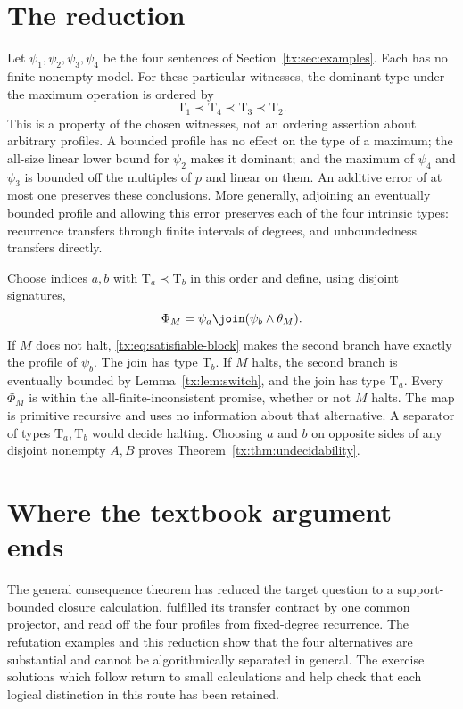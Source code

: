\section{The reduction}
Let $\psi_1,\psi_2,\psi_3,\psi_4$ be the four sentences of
Section~\ref{tx:sec:examples}. Each has no finite nonempty model. For these particular
witnesses, the dominant type under the maximum operation is ordered by
\[
                 \mathrm T_1\prec\mathrm T_4\prec\mathrm T_3\prec\mathrm T_2.
\]
This is a property of the chosen witnesses, not an ordering assertion about
arbitrary profiles. A bounded profile has no effect on the type of a maximum;
the all-size linear lower bound for $\psi_2$ makes it dominant; and the
maximum of $\psi_4$ and $\psi_3$ is bounded off the multiples of $p$ and
linear on them. An additive error of at most one preserves these conclusions.
More generally, adjoining an eventually bounded profile and allowing this
error preserves each of the four intrinsic types: recurrence transfers
through finite intervals of degrees, and unboundedness transfers directly.

Choose indices $a,b$ with $\mathrm T_a\prec\mathrm T_b$ in this order
and define, using disjoint signatures,
\[
             \Phi_M=\psi_a\join(\psi_b\wedge\theta_M).
\]
If $M$ does not halt, \eqref{tx:eq:satisfiable-block} makes the second branch
have exactly the profile of $\psi_b$. The join has type $\mathrm T_b$. If $M$ halts,
the second branch is eventually bounded by Lemma~\ref{tx:lem:switch}, and the
join has type $\mathrm T_a$. Every $\Phi_M$ is within the all-finite-inconsistent
promise, whether or not $M$ halts. The map is primitive recursive and
uses no information about that alternative. A separator of types $\mathrm T_a,\mathrm T_b$
would decide halting. Choosing $a$ and $b$ on opposite sides of any
disjoint nonempty $A,B$ proves Theorem~\ref{tx:thm:undecidability}.

\section{Where the textbook argument ends}
The general consequence theorem has reduced the target question to a
support-bounded closure calculation, fulfilled its transfer contract by
one common projector, and read off the four profiles from fixed-degree
recurrence. The refutation examples and this reduction show that the
four alternatives are substantial and cannot be algorithmically
separated in general. The exercise solutions which follow return to
small calculations and help check that each logical distinction in this
route has been retained.
